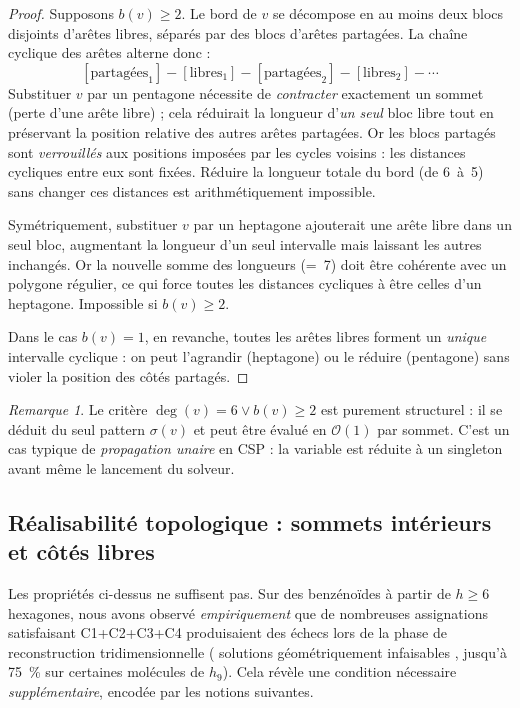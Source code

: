 \documentclass[12pt,a4paper]{article}
\theoremstyle{definition}
\theoremstyle{remark}
\newtheorem{remarque}[definition]{Remarque}
\newcommand{\degv}{\deg(v)}
\newcommand{\bigO}{\mathcal{O}}
\begin{document}
\begin{proof}
Supposons $b(v) \geq 2$. Le bord de $v$ se d\'ecompose en au moins deux
blocs disjoints d'ar\^etes libres, s\'epar\'es par des blocs d'ar\^etes
partag\'ees. La cha\^ine cyclique des ar\^etes alterne donc :
\[
  [\text{partag\'ees}_1] - [\text{libres}_1] - [\text{partag\'ees}_2]
  - [\text{libres}_2] - \cdots
\]
Substituer $v$ par un pentagone n\'ecessite de \emph{contracter}
exactement un sommet (perte d'une ar\^ete libre) ; cela r\'eduirait la
longueur d'\emph{un seul} bloc libre tout en pr\'eservant la position
relative des autres ar\^etes partag\'ees. Or les blocs partag\'es sont
\emph{verrouill\'es} aux positions impos\'ees par les cycles voisins :
les distances cycliques entre eux sont fix\'ees. R\'eduire la longueur
totale du bord (de 6~\`a~5) sans changer ces distances est arithm\'etiquement
impossible.

Sym\'etriquement, substituer $v$ par un heptagone ajouterait une ar\^ete
libre dans un seul bloc, augmentant la longueur d'un seul intervalle mais
laissant les autres inchang\'es. Or la nouvelle somme des longueurs
(=~7) doit \^etre coh\'erente avec un polygone r\'egulier, ce qui force
toutes les distances cycliques \`a \^etre celles d'un heptagone. Impossible
si $b(v) \geq 2$.

Dans le cas $b(v) = 1$, en revanche, toutes les ar\^etes libres forment
un \emph{unique} intervalle cyclique : on peut l'agrandir (heptagone) ou
le r\'eduire (pentagone) sans violer la position des c\^ot\'es partag\'es.
\end{proof}

\begin{remarque}
Le crit\`ere $\degv = 6 \lor b(v) \geq 2$ est purement structurel : il se
d\'eduit du seul pattern $\sigma(v)$ et peut \^etre \'evalu\'e en
$\bigO(1)$ par sommet. C'est un cas typique de \emph{propagation
unaire} en CSP : la variable est r\'eduite \`a un singleton avant m\^eme
le lancement du solveur.
\end{remarque}

\subsection{R\'ealisabilit\'e topologique : sommets int\'erieurs et c\^ot\'es libres}
\label{sec:c2bis-prep}

Les propri\'et\'es ci-dessus ne suffisent pas. Sur des benz\'eno\"ides
\`a partir de $h \geq 6$ hexagones, nous avons observ\'e \emph{empiriquement}
que de nombreuses assignations satisfaisant C1+C2+C3+C4 produisaient des
\'echecs lors de la phase de reconstruction tridimensionnelle (\og
solutions g\'eom\'etriquement infaisables \fg{}, jusqu'\`a 75~\% sur
certaines mol\'ecules de $h_9$). Cela r\'ev\`ele une condition n\'ecessaire
\emph{suppl\'ementaire}, encod\'ee par les notions suivantes.
\end{document}
